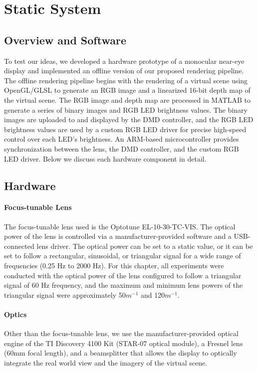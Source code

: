 \section{Static System}
\subsection{Overview and Software}
To test our ideas, we developed a hardware prototype of a monocular near-eye display and implemented an offline version of our proposed rendering pipeline. The offline rendering pipeline begins with the rendering of a virtual scene using OpenGL/GLSL to generate an RGB image and a linearized 16-bit depth map of the virtual scene. The RGB image and depth map are processed in MATLAB to generate a series of binary images and RGB LED brightness values. The binary images are uploaded to and displayed by the DMD controller, and the RGB LED brightness values are used by a custom RGB LED driver for precise high-speed control over each LED's brightness. An ARM-based microcontroller provides synchronization between the lens, the DMD controller, and the custom RGB LED driver. Below we discuss each hardware component in detail.



\subsection{Hardware}
\paragraph{Focus-tunable Lens} The focus-tunable lens used is the Optotune EL-10-30-TC-VIS. The optical power of the lens is controlled via a manufacturer-provided software and a USB-connected lens driver. The optical power can be set to a static value, or it can be set to follow a rectangular, sinusoidal, or triangular signal for a wide range of frequencies (0.25 Hz to 2000 Hz). For this chapter, all experiments were conducted with the optical power of the lens configured to follow a triangular signal of 60 Hz frequency, and the maximum and minimum lens powers of the triangular signal were approximately 50$m^{-1}$ and 120$m^{-1}$. 




\paragraph{Optics} Other than the focus-tunable lens, we use the manufacturer-provided optical engine of the TI Discovery 4100 Kit (STAR-07 optical module), a Fresnel lens (60mm focal length), and a beamsplitter that allows the display to optically integrate the real world view and the imagery of the virtual scene. 

